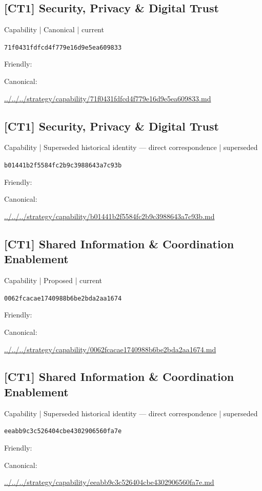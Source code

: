 \documentclass[10pt,a4paper]{article}
\begin{document}
\subsection*{[CT1] Security, Privacy \& Digital Trust}
{\small Capability | Canonical | current}\par
\texttt{71f0431fdfcd4f779e16d9e5ea609833}\par
Friendly: \par
Canonical: \par
{\footnotesize\url{../../../strategy/capability/71f0431fdfcd4f779e16d9e5ea609833.md}}\par
\subsection*{[CT1] Security, Privacy \& Digital Trust}
{\small Capability | Superseded historical identity — direct correspondence | superseded}\par
\texttt{b01441b2f5584fc2b9c3988643a7c93b}\par
Friendly: \par
Canonical: \par
{\footnotesize\url{../../../strategy/capability/b01441b2f5584fc2b9c3988643a7c93b.md}}\par
\subsection*{[CT1] Shared Information \& Coordination Enablement}
{\small Capability | Proposed | current}\par
\texttt{0062fcacae1740988b6be2bda2aa1674}\par
Friendly: \par
Canonical: \par
{\footnotesize\url{../../../strategy/capability/0062fcacae1740988b6be2bda2aa1674.md}}\par
\subsection*{[CT1] Shared Information \& Coordination Enablement}
{\small Capability | Superseded historical identity — direct correspondence | superseded}\par
\texttt{eeabb9c3c526404cbe4302906560fa7e}\par
Friendly: \par
Canonical: \par
{\footnotesize\url{../../../strategy/capability/eeabb9c3c526404cbe4302906560fa7e.md}}\par
\end{document}
